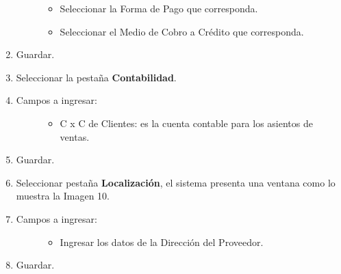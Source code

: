 \documentclass[letterpaper,10pt,spanish]{sphinxmanual}
\begin{document}
\begin{enumerate}
\begin{description}
\begin{itemize}
\item {} 
Seleccionar la Forma de Pago que corresponda.

\item {} 
Seleccionar el Medio de Cobro a Crédito que corresponda.

\end{itemize}

\end{description}

\item {} 
Guardar.

\item {} 
Seleccionar la pestaña \textbf{Contabilidad}.

\item {} \begin{description}
\item[{Campos a ingresar:}] \leavevmode\begin{itemize}
\item {} 
C x C de Clientes: es la cuenta contable para los asientos de ventas.

\end{itemize}

\end{description}

\item {} 
Guardar.

\item {} 
Seleccionar pestaña \textbf{Localización}, el sistema presenta una ventana como lo muestra la Imagen 10.

\item {} \begin{description}
\item[{Campos a ingresar:}] \leavevmode\begin{itemize}
\item {} 
Ingresar los datos de la Dirección del Proveedor.

\end{itemize}

\end{description}

\item {} 
Guardar.

\end{enumerate}
\end{document}
